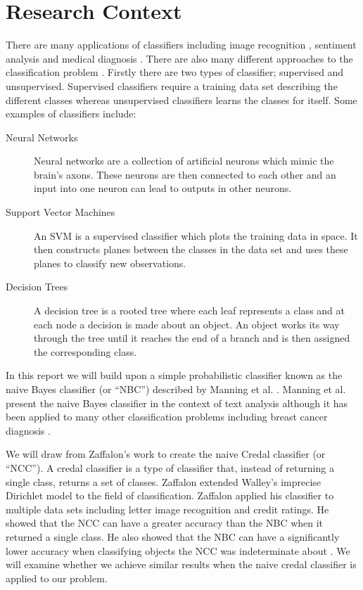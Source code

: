 \section{Research Context}
There are many applications of classifiers including image recognition \cite{Chapelle99}, sentiment analysis \cite{Melville09} and medical diagnosis \cite{Ster96}.
There are also many different approaches to the classification problem \cite{Michie94}.
Firstly there are two types of classifier; supervised and unsupervised.
Supervised classifiers require a training data set describing the different classes whereas unsupervised classifiers learns the classes for itself.
Some examples of classifiers include:
\begin{description}
	\item[Neural Networks] Neural networks are a collection of artificial neurons which mimic the brain's axons. These neurons are then connected to each other and an input into one neuron can lead to outputs in other neurons.
	\item[Support Vector Machines] An SVM is a supervised classifier which plots the training data in space. It then constructs planes between the classes in the data set and uses these planes to classify new observations.
	\item[Decision Trees] A decision tree is a rooted tree where each leaf represents a class and at each node a decision is made about an object. An object works its way through the tree until it reaches the end of a branch and is then assigned the corresponding class. 
\end{description}

In this report we will build upon a simple probabilistic classifier known as the naive Bayes classifier (or ``NBC'') described by Manning et al. \cite{Manning08}.
Manning et al. present the naive Bayes classifier in the context of text analysis although it has been applied to many other classification problems including breast cancer diagnosis \cite{Dumitru09}.

We will draw from Zaffalon's work \cite{Zaffalon01} to create the naive Credal classifier (or ``NCC'').
A credal classifier is a type of classifier that, instead of returning a single class, returns a set of classes.
Zaffalon extended Walley's imprecise Dirichlet model \cite{Walley96} to the field of classification.
Zaffalon applied his classifier to multiple data sets including letter image recognition and credit ratings.
He showed that the NCC can have a greater accuracy than the NBC when it returned a single class.
He also showed that the NBC can have a significantly lower accuracy when classifying objects the NCC was indeterminate about \cite{Zaffalon01}.
We will examine whether we achieve similar results when the naive credal classifier is applied to our problem.

